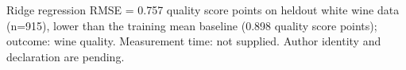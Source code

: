 \documentclass{article}
\begin{document}
Ridge regression RMSE = 0.757 quality score points on heldout white wine data (n=915), lower than the training mean baseline (0.898 quality score points); outcome: wine quality. Measurement time: not supplied.
Author identity and declaration are pending.
\end{document}
